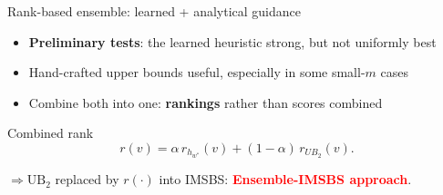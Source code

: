 \documentclass{beamer}
\begin{document}
\begin{frame}{Rank-based ensemble: learned + analytical guidance}
\begin{itemize}
  \item \textbf{Preliminary tests}: the learned heuristic strong, but not uniformly best
  \item Hand-crafted upper bounds useful, especially in some small-$m$ cases \vspace{0.3cm}
  \item %
  Combine both into one: \textbf{rankings} rather than scores combined
\end{itemize}
\vspace{0.25cm}
\begin{block}{Combined rank}
\[
 r(v)=\alpha\,r_{h_{w^*}}(v)+(1-\alpha)\,r_{UB_2}(v).
\]
\end{block}
\vspace{0.15cm}
$\Rightarrow \textrm{UB}_2$ replaced by $r(\cdot)$ into IMSBS:  \textcolor{red}{\textbf{Ensemble-IMSBS approach}}.
\end{frame}
\end{document}
